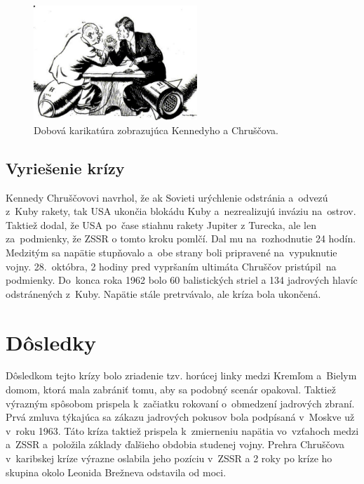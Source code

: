 \documentclass[a4paper]{article}
\begin{document}
\begin{figure}[htbp]
    \begin{center}
        \includegraphics[width=0.55\textwidth]{karikatura}
    \end{center}
    \captionsetup{skip=0pt}
    \caption{Dobová karikatúra zobrazujúca Kennedyho a Chruščova. \cite{hn}} 
    \label{karikatura}
\end{figure}

\subsection{Vyriešenie krízy}
Kennedy Chruščovovi navrhol, že ak Sovieti urýchlenie odstránia a~odvezú z~Kuby rakety, tak USA ukončia blokádu Kuby a~nezrealizujú inváziu na~ostrov. Taktiež dodal, že USA po~čase stiahnu rakety Jupiter z Turecka, ale len za~podmienky, že ZSSR o tomto kroku pomlčí. Dal mu na~rozhodnutie 24 hodín. Medzitým sa napätie stupňovalo a~obe strany boli pripravené na~vypuknutie vojny. 28.~októbra, 2 hodiny pred vypršaním ultimáta Chruščov pristúpil~na 
podmienky. Do~konca roka 1962 bolo 60 balistických striel a 134 jadrových hlavíc odstránených z~Kuby. Napätie stále pretrvávalo, ale kríza bola ukončená.

\section{Dôsledky}
Dôsledkom tejto krízy bolo zriadenie tzv. horúcej linky medzi Kremľom a~Bielym domom, ktorá mala zabrániť tomu, aby sa podobný scenár opakoval. \cite{dennikn} Taktiež výrazným spôsobom prispela k~začiatku rokovaní o~obmedzení jadrových zbraní. Prvá zmluva týkajúca sa zákazu jadrových pokusov bola podpísaná v~Moskve už v~roku 1963. Táto kríza taktiež prispela k~zmierneniu napätia vo~vzťahoch medzi a~ZSSR a~položila základy ďalšieho obdobia studenej vojny. Prehra Chruščova v~karibskej kríze výrazne oslabila jeho pozíciu v~ZSSR a 2 roky po kríze ho skupina okolo Leonida Brežneva odstavila od moci. \cite{hn}

\printbibliography[heading=bibintoc]

\begingroup
\let\clearpage\relax
\printindex
\endgroup
\end{document}
